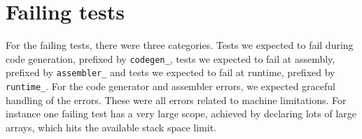 \documentclass[oneside]{amsart}
\theoremstyle{definition}
\theoremstyle{remark}
\numberwithin{equation}{section}
\begin{document}
\section{Failing tests}
For the failing tests, there were three categories. Tests we expected to fail during code
generation, prefixed by \texttt{codegen\_}, tests we expected to fail at assembly, prefixed by
\texttt{assembler\_} and tests we expected to fail at runtime, prefixed by \texttt{runtime\_}. For
the code generator and assembler errors, we expected graceful handling of the errors. These were
all errors related to machine limitations. For instance one failing test has a very large scope,
achieved by declaring lots of large arrays, which hits the available stack space limit.

\newpage
{}
\end{document}

